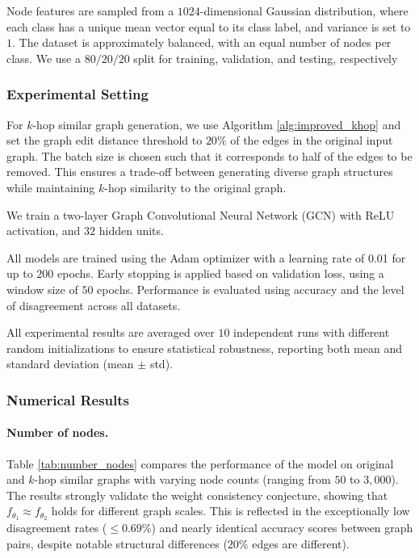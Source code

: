 Node features are sampled from a $1024$-dimensional Gaussian distribution, where each class has a unique mean vector equal to its class label, and variance is set to $1$. The dataset is approximately balanced, with an equal number of nodes per class. We use a $80/20/20$ split for training, validation, and testing, respectively
 
\subsubsection{Experimental Setting}
For $k$-hop similar graph generation, we use Algorithm \ref{alg:improved_khop} and set the graph edit distance threshold to $20\%$ of the edges in the original input graph. The batch size is chosen such that it corresponds to half of the edges to be removed. This ensures a trade-off between generating diverse graph structures while maintaining $k$-hop similarity to the original graph.

We train a two-layer Graph Convolutional Neural Network (GCN) \cite{kipf2017semisupervisedclassificationgraphconvolutional} with ReLU activation, and $32$ hidden units.

All models are trained using the Adam optimizer \cite{kingma2017adammethodstochasticoptimization}  with a learning rate of 0.01 for up to $200$ epochs. Early stopping is applied based on validation loss, using a window size of $50$ epochs. Performance is evaluated using accuracy and the level of disagreement across all datasets. 

All experimental results are averaged over $10$ independent runs with different random initializations to ensure statistical robustness, reporting both mean and standard deviation (mean $\pm$ std).


\subsubsection{Numerical Results}
\paragraph{Number of nodes.}
Table \ref{tab:number_nodes} compares the performance of the model on original and $k$-hop similar graphs with varying node counts (ranging from $50$ to $3,000$). The results strongly validate the weight consistency conjecture, showing that $ f_{\theta_1} \approx f_{\theta_2} $ holds for different graph scales. This is reflected in the exceptionally low disagreement rates ($\leq 0.69\%$) and nearly identical accuracy scores between graph pairs, despite notable structural differences ($20\%$ edges are different).




